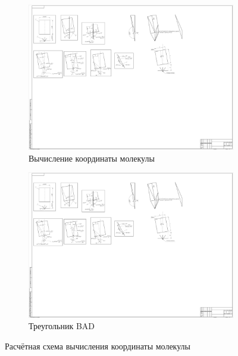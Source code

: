 \documentclass[../AISTR.tex]{subfiles}
\begin{document}
\begin{figure}[p]
	\begin{subfigure}{0.5\linewidth}
		\centering
		\includegraphics[trim=1030 1215 2015 770, clip, height=0.85\linewidth]{../images/schemes}
		\caption{Вычисление координаты молекулы}
		\label{fig:calculate}
	\end{subfigure}
	\begin{subfigure}{0.5\linewidth}
		\centering
		\includegraphics[trim=1425 1345 1660 800, clip, height=0.85\linewidth]{../images/schemes}
		\caption{Треугольник BAD}
		\label{fig:BAD}
	\end{subfigure}
	\caption{Расчётная схема вычисления координаты молекулы}
	\label{fig:monte-carlo}
\end{figure}
\end{document}
